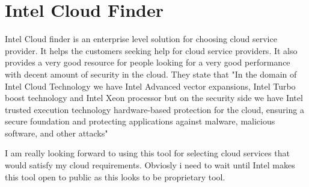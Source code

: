 \section{Intel Cloud Finder}

Intel Cloud finder is an enterprise level solution for choosing cloud service 
provider. It helps the customers seeking help for cloud service providers. It 
also provides a very good resource for people looking for a very good 
performance with decent amount of security in the cloud. They state that 
"In the domain of Intel Cloud Technology we have Intel Advanced vector expansions, 
Intel Turbo boost technology and Intel Xeon processor but on the 
security side we have Intel trusted execution technology hardware-based protection 
for the cloud, ensuring a secure foundation and protecting applications against 
malware, malicious software, and other attacks" \cite{Intel}

I am really looking forward to using this tool for selecting cloud services that would satisfy 
my cloud requirements. Obviosly i need to wait until Intel makes this tool open to public as this
looks to be proprietary tool.
